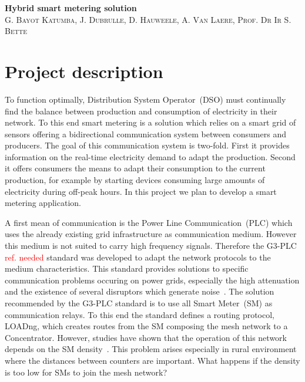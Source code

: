 \documentclass[a4paper,10pt]{article}
\newcommand{\FIXME}[1]{\textcolor{red}{\framebox{FIXME:} #1}}
\begin{document}

\begin{center}
  \huge\textbf{Hybrid smart metering solution}\\
  \vspace{0.5em}
  \small\textsc{G. Bayot Katumba, J. Dubrulle, D. Hauweele, A. Van Laere, Prof. Dr Ir S. Bette}
\end{center}

\section{Project description}

To function optimally, Distribution System Operator~(DSO)
must continually find the balance between production and
consumption of electricity in their network. To this end
smart metering is a solution which relies on a smart grid of
sensors offering a bidirectional communication system
between consumers and producers. The goal of this
communication system is two-fold. First it provides
information on the real-time electricity demand to adapt the
production. Second it offers consumers the means to adapt
their consumption to the current production, for example by
starting devices consuming large amounts of electricity
during off-peak hours. In this project we plan to develop a
smart metering application.

A first mean of communication is the Power Line
Communication~(PLC) which uses the already existing grid
infrastructure as communication medium. However this medium
is not suited to carry high frequency signals. Therefore the
G3-PLC\FIXME{ref. needed} standard was developed to adapt
the network protocols to the medium characteristics. This
standard provides solutions to specific communication
problems occuring on power grids, especially the high
attenuation and the existence of several disruptors which
generate noise~\cite{itu_sim2016}. The solution recommended
by the G3-PLC standard is to use all Smart Meter~(SM) as
communication relays. To this end the standard defines a
routing protocol, LOADng, which creates routes from the SM
composing the mesh network to a Concentrator. However,
studies have shown that the operation of this network
depends on the SM density~\cite{g3plc_density2015}. This
problem arises especially in rural environment where the
distances between counters are important. What happens if
the density is too low for SMs to join the mesh network?
\end{document}
